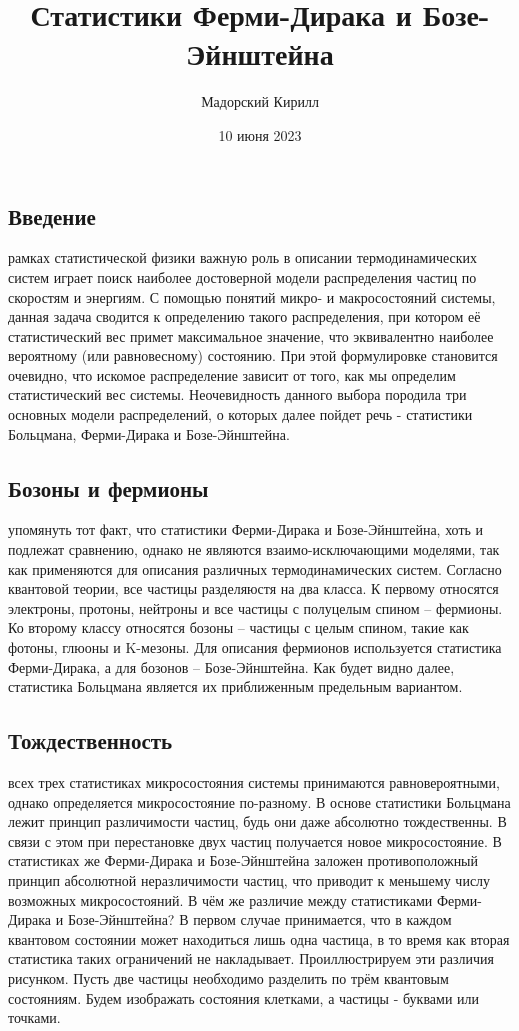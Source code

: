 \documentclass[a4paper,12pt]{article}
\title{Статистики Ферми-Дирака и Бозе-Эйнштейна}
\author{Мадорский Кирилл}
\date{10 июня 2023}
\begin{document}
\subsection*{Введение}
\par\indent{} рамках статистической физики важную роль в описании термодинамических систем играет поиск наиболее достоверной модели распределения частиц по скоростям и энергиям. С помощью понятий микро- и макросостояний системы, данная задача сводится к определению такого распределения, при котором её статистический вес примет максимальное значение, что эквивалентно наиболее вероятному (или равновесному) состоянию. При этой формулировке становится очевидно, что искомое распределение зависит от того, как мы определим статистический вес системы. Неочевидность данного выбора породила три основных модели распределений, о которых далее пойдет речь - статистики Больцмана, Ферми-Дирака и Бозе-Эйнштейна.


\subsection*{Бозоны и фермионы}
\par\indent{} упомянуть тот факт, что статистики Ферми-Дирака и Бозе-Эйнштейна, хоть и подлежат сравнению, однако не являются взаимо-исключающими моделями, так как применяются для описания различных термодинамических систем. Согласно квантовой теории, все частицы разделяюстя на два класса. К первому относятся электроны, протоны, нейтроны и все частицы с полуцелым спином -- фермионы. Ко второму классу относятся бозоны -- частицы с целым спином, такие как фотоны, глюоны и K-мезоны. Для описания фермионов используется статистика Ферми-Дирака, а для бозонов -- Бозе-Эйнштейна. Как будет видно далее, статистика Больцмана является их приближенным предельным вариантом.
\newpage

\subsection*{Тождественность}
\par\indent{} всех трех статистиках микросостояния системы принимаются равновероятными, однако определяется микросостояние по-разному. В основе статистики Больцмана лежит принцип различимости частиц, будь они даже абсолютно тождественны. В связи с этом при перестановке двух частиц получается новое микросостояние. В статистиках же Ферми-Дирака и Бозе-Эйнштейна заложен противоположный принцип абсолютной неразличимости частиц, что приводит к меньшему числу возможных микросостояний. В чём же различие между статистиками Ферми-Дирака и Бозе-Эйнштейна? В первом случае принимается, что в каждом квантовом состоянии может находиться лишь одна частица, в то время как вторая статистика таких ограничений не накладывает. Проиллюстрируем эти различия рисунком. Пусть две частицы необходимо разделить по трём квантовым состояниям. Будем изображать состояния клетками, а частицы - буквами или точками.
\end{document}
